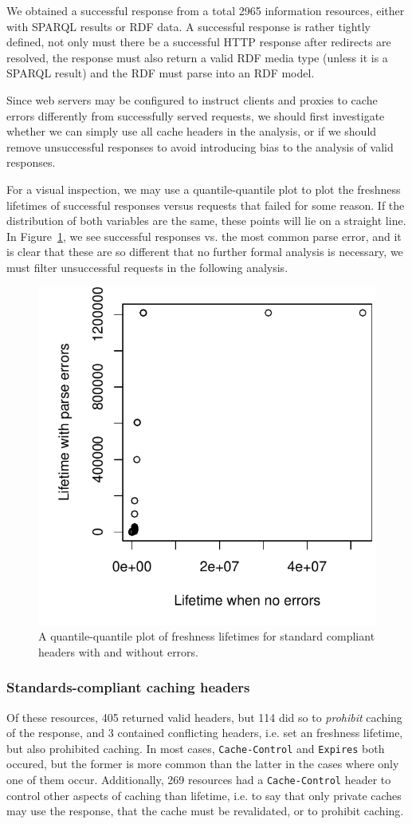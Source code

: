 \documentclass{llncs}
\newcommand{\httph}[1]{\texttt{#1}}
\begin{document}
We obtained a successful response from a total 2965 information
resources, either with SPARQL results or RDF data. A successful
response is rather tightly defined, not only must there be a
successful HTTP response after redirects are resolved, the response must also
return a valid RDF media type (unless it is a SPARQL result) and the
RDF must parse into an RDF model.

Since web servers may be configured to instruct clients and proxies to
cache errors differently from successfully served requests, we should
first investigate whether we can simply use all cache headers in the
analysis, or if we should remove unsuccessful responses to avoid
introducing bias to the analysis of valid responses.

For a visual inspection, we may use a quantile-quantile plot to plot
the freshness lifetimes of successful responses versus requests that
failed for some reason. If the distribution of both variables are the
same, these points will lie on a straight line. In
Figure~\ref{fig:errorsqq}, we see successful responses vs. the most
common parse error, and it is clear that these are so different that
no further formal analysis is necessary, we must filter unsuccessful
requests in the following analysis.


\begin{figure}[ht!]
  \centerline{%
    \includegraphics[width=.5\textwidth]{errorsqq.pdf}}
  \caption{A quantile-quantile plot of freshness lifetimes for
    standard compliant headers with and without errors.}
  \label{fig:errorsqq}
\end{figure}


\subsubsection{Standards-compliant caching headers}

Of these resources, 405 returned valid headers, but 114 did so to
\emph{prohibit} caching of the response, and 3 contained conflicting
headers, i.e. set an freshness lifetime, but also prohibited
caching. In most cases, \httph{Cache-Control} and \httph{Expires} both
occured, but the former is more common than the latter in the cases
where only one of them occur.  Additionally, 269 resources had a
\httph{Cache-Control} header to control other aspects of caching than
lifetime, i.e. to say that only private caches may use the response,
that the cache must be revalidated, or to prohibit caching.
\end{document}
